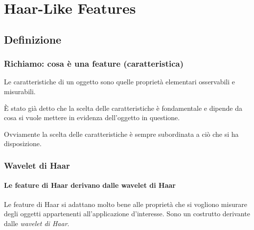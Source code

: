 
\chapter{Haar-Like Features}
\label{chap:features}
    \section{Definizione}
    \label{sec:haar_features_definition}
        \subsection{Richiamo: cosa è una feature (caratteristica)}
                Le caratteristiche di un oggetto sono quelle proprietà elementari osservabili e misurabili.

                È stato già detto che la scelta delle caratteristiche è fondamentale e dipende da cosa si vuole mettere in evidenza dell'oggetto in questione.

                Ovviamente la scelta delle caratteristiche è sempre subordinata a ciò che si ha disposizione.
        \subsection{Wavelet di Haar}
            \subsubsection{Le feature di Haar derivano dalle wavelet di Haar}
                Le feature di Haar si adattano molto bene alle proprietà che si vogliono misurare degli oggetti appartenenti all'applicazione d'interesse.
                Sono un costrutto derivante dalle \emph{wavelet di Haar}.
